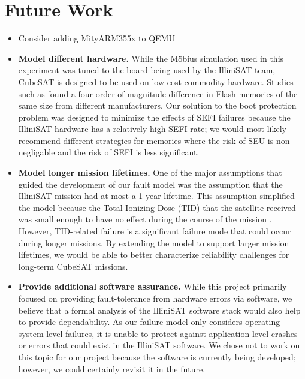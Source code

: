 \section{Future Work}\label{sec:future_work}
\begin{itemize}
  \item Consider adding MityARM355x to QEMU
  \item {\bf Model different hardware.}  While the M\"obius simulation used in this experiment was tuned to the board being used by the IlliniSAT team, CubeSAT is designed to be used on low-cost commodity hardware.  Studies such as \cite{Oldham2008TID} found a four-order-of-magnitude difference in Flash memories of the same size from different manufacturers.  Our solution to the boot protection problem was designed to minimize the effects of SEFI failures because the IlliniSAT hardware has a relatively high SEFI rate; we would most likely recommend different strategies for memories where the risk of SEU is non-negligable and the risk of SEFI is less significant.
  \item {\bf Model longer mission lifetimes.}  One of the major assumptions that guided the development of our fault model was the assumption that the IlliniSAT mission had at most a 1 year lifetime.  This assumption simplified the model because the Total Ionizing Dose (TID) that the satellite received was small enough to have no effect during the course of the mission \cite{Likar2010Novel, Oldham2008TID}.  However, TID-related failure is a significant failure mode that could occur during longer missions.  By extending the model to support larger mission lifetimes, we would be able to better characterize reliability challenges for long-term CubeSAT missions.
  \item {\bf Provide additional software assurance.} While this project primarily focused on providing fault-tolerance from hardware errors via software, we believe that a formal analysis of the IlliniSAT software stack would also help to provide dependability.  As our failure model only considers operating system level failures, it is unable to protect against application-level crashes or errors that could exist in the IlliniSAT software.  We chose not to work on this topic for our project because the software is currently being developed; however, we could certainly revisit it in the future.
\end{itemize}
